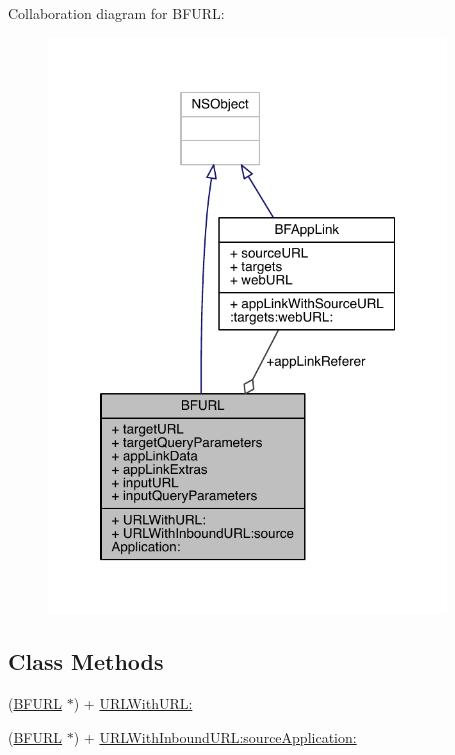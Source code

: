 Collaboration diagram for B\-F\-U\-R\-L\-:
\nopagebreak
\begin{figure}[H]
\begin{center}
\leavevmode
\includegraphics[width=299pt]{interface_b_f_u_r_l__coll__graph}
\end{center}
\end{figure}
\subsection*{Class Methods}
\begin{DoxyCompactItemize}
\item 
(\hyperlink{interface_b_f_u_r_l}{B\-F\-U\-R\-L} $\ast$) + \hyperlink{interface_b_f_u_r_l_a0b209ec98da7b4e1f41a94c301fce3f8}{U\-R\-L\-With\-U\-R\-L\-:}
\item 
(\hyperlink{interface_b_f_u_r_l}{B\-F\-U\-R\-L} $\ast$) + \hyperlink{interface_b_f_u_r_l_a376fbc94419b0c0d496b08a395c98ab2}{U\-R\-L\-With\-Inbound\-U\-R\-L\-:source\-Application\-:}
\end{DoxyCompactItemize}
